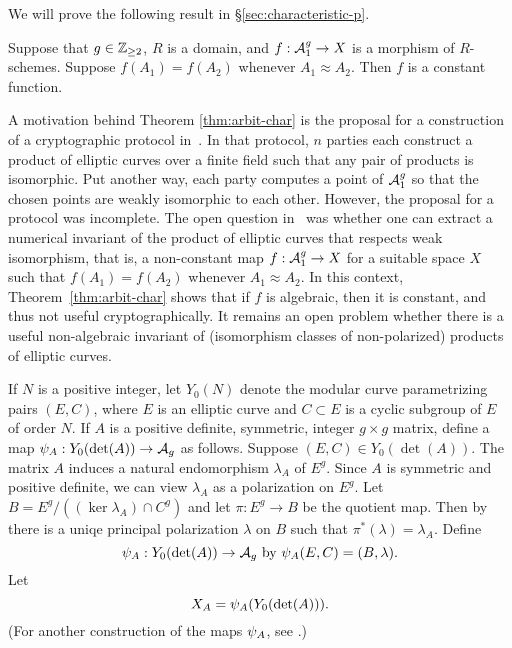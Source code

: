 \documentclass{amsart}
\begin{document}
We will prove the following result in \S\ref{sec:characteristic-p}.
\begin{theorem}\label{thm:arbit-char}
  Suppose that $g\in\mathbb{Z}_{\ge 2}$, $R$ is a domain, and $f: \mathcal{A}_1^g \to X$ is a morphism of $R$-schemes. Suppose $f(A_1) = f(A_2)$ whenever $A_1 \approx A_2$. Then $f$ is a constant function.
\end{theorem}

A motivation behind Theorem \ref{thm:arbit-char} is the proposal for a construction of a cryptographic protocol in~\cite{multiparty}. In that protocol, $n$ parties each construct a product of elliptic curves over a finite field such that any pair of products is isomorphic. Put another way, each party computes a point of $\mathcal{A}_1^g$ so that the chosen points are weakly isomorphic to each other. However, the proposal for a protocol was incomplete. The open question in~\cite{multiparty} was whether one can extract a numerical invariant of the product of elliptic curves that respects weak isomorphism, that is, a non-constant map $f: \mathcal{A}_1^g \to X$ for a suitable space $X$ such that $f(A_1) = f(A_2)$ whenever $A_1 \approx A_2$. In this context, Theorem~\ref{thm:arbit-char} shows that if $f$ is algebraic, then it is constant, and thus not useful cryptographically. It remains an open problem whether there is a useful non-algebraic invariant of (isomorphism classes of non-polarized) products of elliptic curves.


If $N$ is a positive integer, let $Y_0(N)$ denote the modular curve parametrizing pairs $(E, C)$, where $E$ is an elliptic curve and $C \subset E$ is a cyclic subgroup of $E$ of order $N$. If $A$ is a positive definite, symmetric, integer $g\times g$ matrix, define a map $\psi_{A}: Y_0(\det(A)) \to \mathcal{A}_g$ as follows. Suppose $(E, C) \in Y_0(\det(A))$. The matrix $A$ induces a natural endomorphism $\lambda_A$ of $E^g$. Since $A$ is symmetric and positive definite, we can view $\lambda_A$ as a polarization on $E^g$. Let $B = E^g/((\ker \lambda_A) \cap C^g)$ and let $\pi: E^g \to B$ be the quotient map. Then by~\cite[Prop. 16.8]{milne-av} there is a uniqe principal polarization $\lambda$ on $B$ such that $\pi^*(\lambda) = \lambda_A$. Define
\begin{equation}\label{def:psimoddef}
\psi_{A}: Y_0(\det(A)) \to \mathcal{A}_g  \text{ by } \psi_{A}(E,C) = (B,\lambda).
\end{equation}
Let
\begin{equation}\label{def:XAdef}
X_A=\psi_{A}(Y_0(\det(A))).
\end{equation}
(For another construction of the maps $\psi_{A}$, see \cite[p. 19 et seq.]{rains}.)
\end{document}
